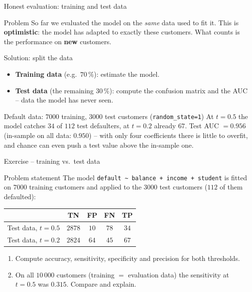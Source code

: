 \documentclass[aspectratio=169,11pt]{beamer}
\begin{document}
\begin{frame}{Honest evaluation: training and test data}
  \begin{block}{Problem}
    So far we evaluated the model on the \emph{same} data used to fit it.
    This is \textbf{optimistic}: the model has adapted to exactly these
    customers. What counts is the performance on \textbf{new} customers.
  \end{block}
  \begin{block}{Solution: split the data}
    \begin{itemize}
      \item \textbf{Training data} (e.g.\ $70\,\%$): estimate the model.
      \item \textbf{Test data} (the remaining $30\,\%$): compute the
            confusion matrix and the AUC -- data the model has never seen.
    \end{itemize}
  \end{block}
  \begin{exampleblock}{Default data: $7000$ training, $3000$ test customers (\texttt{random\_state=1})}
    At $t=0.5$ the model catches $34$ of $112$ test defaulters, at $t=0.2$
    already $67$. Test AUC $=0.956$ (in-sample on all data: $0.950$) -- with
    only four coefficients there is little to overfit, and chance can even
    push a test value above the in-sample one.
  \end{exampleblock}
\end{frame}

\begin{frame}{Exercise -- training vs.\ test data}
  \begin{block}{Problem statement}
    The model \texttt{default \textasciitilde\ balance + income + student} is
    fitted on $7000$ training customers and applied to the $3000$ test
    customers ($112$ of them defaulted):
    \begin{center}
      \renewcommand{\arraystretch}{1.2}
      \begin{tabular}{lcccc}
        \toprule
        & TN & FP & FN & TP\\
        \midrule
        Test data, $t=0.5$ & $2878$ & $10$ & $78$ & $34$\\
        Test data, $t=0.2$ & $2824$ & $64$ & $45$ & $67$\\
        \bottomrule
      \end{tabular}
    \end{center}
    \begin{enumerate}
      \item Compute accuracy, sensitivity, specificity and precision for
            both thresholds.
      \item On all $10\,000$ customers (training $=$ evaluation data) the
            sensitivity at $t=0.5$ was $0.315$. Compare and explain.
    \end{enumerate}
  \end{block}
\end{frame}
\end{document}
